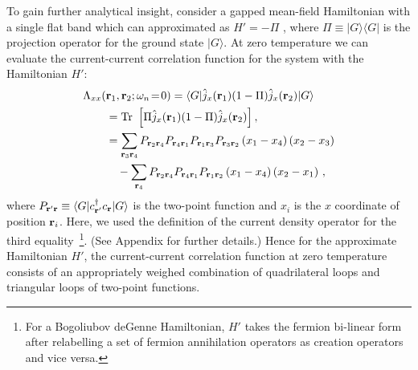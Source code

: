 \documentclass[amsmath,amssymb, aps, prx, longbibliography, twocolumn]{revtex4-1}
\begin{document}
To gain further  analytical insight, consider 
a gapped mean-field Hamiltonian with a single flat band which can approximated as $H'=-\Pi$ , where
$\Pi\equiv |G\rangle \langle G|$ is the projection operator for the ground state $|G\rangle$. At zero temperature we can evaluate the current-current correlation function for the system with the Hamiltonian ${H}'$:
\begin{equation}
\left. \begin{aligned}
\Lambda_{xx}(&{\bf r}_1,{\bf r}_2;\omega_n\!=\!0)
= \langle G|\hat{j}_x({\bf r}_1)(1-\Pi) \hat{j}_x({\bf r}_2)|G\rangle \\
   &={\rm Tr}\ \left[\Pi\hat{j}_x({\bf r}_1)(1-\Pi) \hat{j}_x({\bf r}_2)\right],\\
&= \sum_{{\bf r}_3 {\bf r}_4}P_{{\bf r}_2 {\bf r}_4}P_{{\bf r}_4{\bf r}_1}P_{{\bf r}_1{\bf r}_3}P_{{\bf r}_3{\bf r}_2}\left(x_1-x_4\right)\left(x_2-x_3\right) \\
& \quad - \sum_{{\bf r}_4}P_{{\bf r}_2 {\bf r}_4}P_{{\bf r}_4{\bf r}_1}P_{{\bf r}_1{\bf r}_2}\left(x_1-x_4\right)\left(x_2-x_1\right) \,,
\end{aligned}
\right.
\label{eq:j-j}
\end{equation}
where $P_{{\bf r}'{\bf r}}\equiv \langle G|c^\dagger_{{\bf r}'} c_{\bf r}|G\rangle $ is the two-point function and $x_i$ is the $x$ coordinate of position ${\bf r}_i$. Here, we used the definition of the current density operator for the third equality~\footnote{For a Bogoliubov deGenne Hamiltonian, $H'$ takes the fermion bi-linear form after relabelling a set of fermion annihilation operators as creation operators and vice versa.}.
(See Appendix for further details.)
Hence for the approximate Hamiltonian ${H}'$, the current-current correlation function at zero temperature consists of an appropriately weighed combination of quadrilateral loops and triangular loops of two-point functions.
\end{document}
